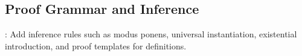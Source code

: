 \subsection{Proof Grammar and Inference}

: Add inference rules such as modus ponens, universal instantiation, existential introduction, and proof templates for definitions.
